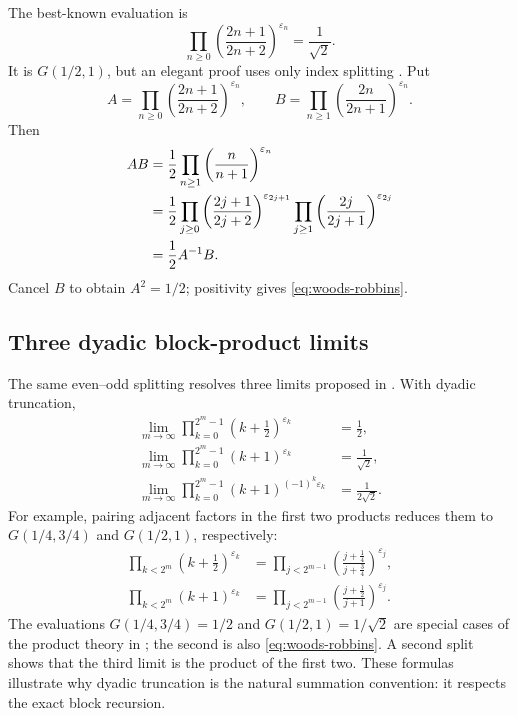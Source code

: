 \documentclass[11pt,oneside]{article}
\theoremstyle{definition}
\theoremstyle{remark}
\newcommand{\eps}{\varepsilon}
\begin{document}
The best-known evaluation is
\begin{equation}
  \boxed{
  \prod_{n\ge0}
   \left(\frac{2n+1}{2n+2}\right)^{\eps_n}
   =\frac1{\sqrt2}.}
  \label{eq:woods-robbins}
\end{equation}
It is \(G(1/2,1)\), but an elegant proof uses only index splitting
\cite{woods,robbins,alloucheShallitUbiquitous}.  Put
\begin{equation}
  A=\prod_{n\ge0}
    \left(\frac{2n+1}{2n+2}\right)^{\eps_n},
  \qquad
  B=\prod_{n\ge1}
    \left(\frac{2n}{2n+1}\right)^{\eps_n}.
  \label{eq:A-B-products}
\end{equation}
Then
\begin{align}
  AB
   &=\frac12\prod_{n\ge1}
      \left(\frac{n}{n+1}\right)^{\eps_n}
      \notag\\
   &=\frac12
      \prod_{j\ge0}
       \left(\frac{2j+1}{2j+2}\right)^{\eps_{2j+1}}
      \prod_{j\ge1}
       \left(\frac{2j}{2j+1}\right)^{\eps_{2j}}
      \notag\\
   &=\frac12A^{-1}B.
  \label{eq:woods-robbins-proof}
\end{align}
Cancel \(B\) to obtain \(A^2=1/2\); positivity gives
\eqref{eq:woods-robbins}.

\subsection{Three dyadic block-product limits}

The same even--odd splitting resolves three limits proposed in
\cite{reshetnikovProductLimits}.  With dyadic truncation,
\begin{align}
  \lim_{m\to\infty}
   \prod_{k=0}^{2^m-1}\left(k+\tfrac12\right)^{\eps_k}
   &=\frac12,
  \label{eq:block-product-one}\\
  \lim_{m\to\infty}
   \prod_{k=0}^{2^m-1}(k+1)^{\eps_k}
   &=\frac1{\sqrt2},
  \label{eq:block-product-two}\\
  \lim_{m\to\infty}
   \prod_{k=0}^{2^m-1}(k+1)^{(-1)^k\eps_k}
   &=\frac1{2\sqrt2}.
  \label{eq:block-product-three}
\end{align}
For example, pairing adjacent factors in the first two products reduces them
to \(G(1/4,3/4)\) and \(G(1/2,1)\), respectively:
\begin{align}
 \prod_{k<2^m}\left(k+\tfrac12\right)^{\eps_k}
  &=\prod_{j<2^{m-1}}
    \left(\frac{j+\tfrac14}{j+\tfrac34}\right)^{\eps_j},
  \label{eq:block-one-reduction}\\
 \prod_{k<2^m}(k+1)^{\eps_k}
  &=\prod_{j<2^{m-1}}
    \left(\frac{j+\tfrac12}{j+1}\right)^{\eps_j}.
  \label{eq:block-two-reduction}
\end{align}
The evaluations
\(G(1/4,3/4)=1/2\) and \(G(1/2,1)=1/\sqrt2\) are special cases of the
product theory in \cite{alloucheRiasatShallit}; the second is also
\eqref{eq:woods-robbins}.  A second split shows that the third limit is the
product of the first two.  These formulas illustrate why dyadic truncation is
the natural summation convention: it respects the exact block recursion.
\end{document}
